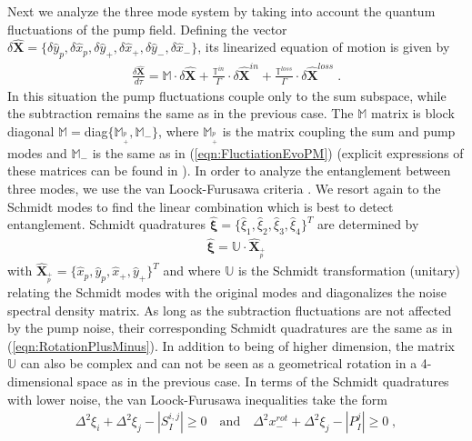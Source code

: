 \documentclass[aps,prl,twocolumn,groupedaddress]{revtex4-1}
\begin{document}
Next we analyze the three mode system by taking into account the quantum fluctuations of the pump field. Defining the vector $\delta\hat{\mathbf{X}}=\{\delta\hat{y}_p,\delta\hat{x}_p,\delta\hat{y}_+,\delta\hat{x}_+,\delta\hat{y}_-,\delta\hat{x}_-\}$, its linearized equation of motion is given by
\begin{eqnarray*}
	\frac{\delta\hat{\mathbf{X}}}{d\tau}=\mathbb{M}\cdot\delta\hat{\mathbf{X}}+\frac{\mathbb{T}^{in}}{\Gamma}\cdot\delta\hat{\mathbf{X}}^{in}+\frac{\mathbb{T}^{loss}}{\Gamma}\cdot\delta\hat{\mathbf{X}}^{loss} \;.
\end{eqnarray*}
In this situation the pump fluctuations couple only to the sum subspace, while the subtraction remains the same as in the previous case. The $\mathbb{M}$ matrix is block diagonal $\mathbb{M}=$diag$\{\mathbb{M}_{^p_+},\mathbb{M}_{-}\}$, where $\mathbb{M}_{^p_+}$ is the matrix coupling the sum and pump modes and  $\mathbb{M}_{-}$ is the same as in (\ref{eqn:FluctiationEvoPM}) (explicit expressions of these matrices can be found in \cite{Gonzalez2017}). In order to analyze the entanglement between three modes, we use the van Loock-Furusawa criteria \cite{vanLoock2003}. We resort again to the Schmidt modes to find the linear combination which is best to detect entanglement. Schmidt quadratures $\hat{\boldsymbol{\xi}}=\{\hat{\xi}_1,\hat{\xi}_2,\hat{\xi}_3,\hat{\xi}_4\}^T$ are determined by
\begin{gather}
\hat{\boldsymbol{\xi}}=\mathbb{U}\cdot \hat{\mathbf{X}}_{_p^+} \label{eqn:RotationPumpPlus}
\end{gather}
with $\hat{\mathbf{X}}_{_p^+}=\{\hat{x}_p,\hat{y}_p,\hat{x}_+,\hat{y}_+\}^T$ and where $\mathbb{U}$ is the Schmidt transformation (unitary) relating the Schmidt modes with the original modes and diagonalizes the noise spectral density matrix. As long as the subtraction fluctuations are not affected by the pump noise, their corresponding Schmidt quadratures are the same as in (\ref{eqn:RotationPlusMinus}). In addition to being of higher dimension, the matrix $\mathbb{U}$ can also be complex and can not be seen as a geometrical rotation in a 4-dimensional space as in the previous case.
In terms of the Schmidt quadratures with lower noise, the van Loock-Furusawa inequalities take the form
\begin{eqnarray}
	\Delta^2 \xi_i+\Delta^2 \xi_j-\left|S_{I}^{i,j}\right|\geq 0\quad\text{and}\quad
	\Delta^2 x_-^{rot}+\Delta^2 \xi_j-\left|P_{I}^{j}\right|\geq 0 \;, \label{eqn:VanlockFIneqn} 
\end{eqnarray}
\end{document}
